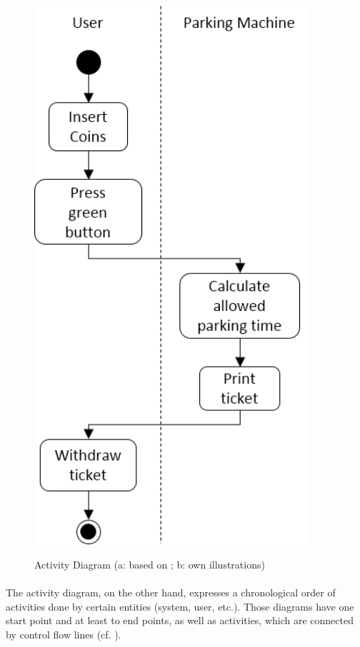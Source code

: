 \begin{figure}[H]
\begin{minipage}[m]{.5\linewidth}
        \includegraphics[width=0.9\textwidth]{img/activityDiagram.png}
        \label{fig:adEx}
    \end{minipage}
    \caption[Activity Diagram Notation and Example]{Activity Diagram (a: based on \cite[160]{Pohl.2007}; b: own illustrations)}\label{fig:adEx}
\end{figure}

\paragraph{} The activity diagram, on the other hand, expresses a chronological order of activities done by certain entities (system, user, etc.). Those diagrams have one start point and at least to end points, as well as activities, which are connected by control flow lines (cf. ).

